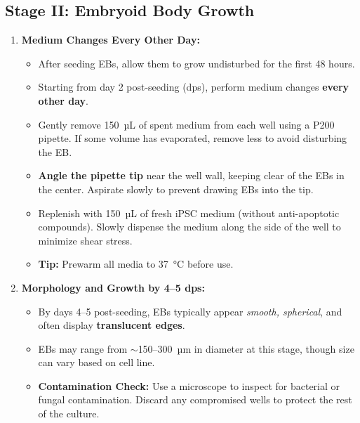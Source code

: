 \documentclass[11pt]{article}
\begin{document}
\subsection{Stage II: Embryoid Body Growth}
\begin{enumerate}[leftmargin=*]
    \item \textbf{Medium Changes Every Other Day:}
    \begin{itemize}[leftmargin=*]
        \item After seeding EBs, allow them to grow undisturbed for the first 48 hours.
        \item Starting from day 2 post-seeding (dps), perform medium changes \textbf{every other day}.
        \item Gently remove 150~µL of spent medium from each well using a P200 pipette. If some volume has evaporated, remove less to avoid disturbing the EB.
        \item \textbf{Angle the pipette tip} near the well wall, keeping clear of the EBs in the center. Aspirate slowly to prevent drawing EBs into the tip.
        \item Replenish with 150~µL of fresh iPSC medium (without anti-apoptotic compounds). Slowly dispense the medium along the side of the well to minimize shear stress.
        \item \textbf{Tip:} Prewarm all media to 37~°C before use.
    \end{itemize}

    \item \textbf{Morphology and Growth by 4--5 dps:}
    \begin{itemize}[leftmargin=*]
        \item By days 4–5 post-seeding, EBs typically appear \textit{smooth, spherical}, and often display \textbf{translucent edges}.
        \item EBs may range from \(\sim\)150–300~µm in diameter at this stage, though size can vary based on cell line.
        \item \textbf{Contamination Check:} Use a microscope to inspect for bacterial or fungal contamination. Discard any compromised wells to protect the rest of the culture.
    \end{itemize}
\end{enumerate}

\end{document}
